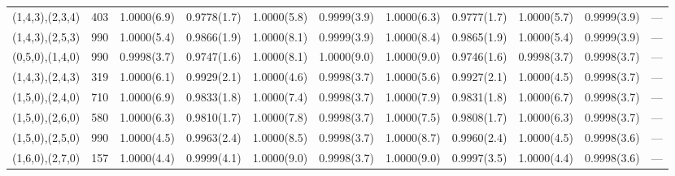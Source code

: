 \begin{tabular}{lrlllllllll}
 (1,4,3),(2,3,4) &  403   & 1.0000(6.9) & 0.9778(1.7)  & 1.0000(5.8) & 0.9999(3.9)    & 1.0000(6.3)  & 0.9777(1.7)    & 1.0000(5.7)  & 0.9999(3.9) & ---    \\
 (1,4,3),(2,5,3) &  990   & 1.0000(5.4) & 0.9866(1.9)  & 1.0000(8.1) & 0.9999(3.9)    & 1.0000(8.4)  & 0.9865(1.9)    & 1.0000(5.4)  & 0.9999(3.9) & ---    \\
 (0,5,0),(1,4,0) &  990   & 0.9998(3.7) & 0.9747(1.6)  & 1.0000(8.1) & 1.0000(9.0)    & 1.0000(9.0)  & 0.9746(1.6)    & 0.9998(3.7)  & 0.9998(3.7) & ---    \\
 (1,4,3),(2,4,3) &  319   & 1.0000(6.1) & 0.9929(2.1)  & 1.0000(4.6) & 0.9998(3.7)    & 1.0000(5.6)  & 0.9927(2.1)    & 1.0000(4.5)  & 0.9998(3.7) & ---    \\
 (1,5,0),(2,4,0) &  710   & 1.0000(6.9) & 0.9833(1.8)  & 1.0000(7.4) & 0.9998(3.7)    & 1.0000(7.9)  & 0.9831(1.8)    & 1.0000(6.7)  & 0.9998(3.7) & ---    \\
 (1,5,0),(2,6,0) &  580   & 1.0000(6.3) & 0.9810(1.7)  & 1.0000(7.8) & 0.9998(3.7)    & 1.0000(7.5)  & 0.9808(1.7)    & 1.0000(6.3)  & 0.9998(3.7) & ---    \\
 (1,5,0),(2,5,0) &  990   & 1.0000(4.5) & 0.9963(2.4)  & 1.0000(8.5) & 0.9998(3.7)    & 1.0000(8.7)  & 0.9960(2.4)    & 1.0000(4.5)  & 0.9998(3.6) & ---    \\
 (1,6,0),(2,7,0) &  157   & 1.0000(4.4) & 0.9999(4.1)  & 1.0000(9.0) & 0.9998(3.7)    & 1.0000(9.0)  & 0.9997(3.5)    & 1.0000(4.4)  & 0.9998(3.6) & ---    \\
\hline
\end{tabular}